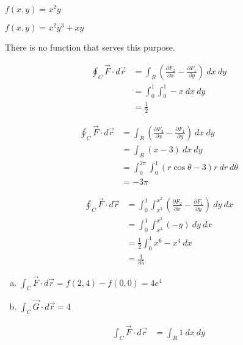 \documentclass[10pt]{extarticle}
\title{}
\author{}
\date{}
\begin{document}
  \begin{problem}{18.4}
    \begin{description}[font=\normalfont]
      \item[2:] $f(x,y) = x^2y$
      \item[6:] $f(x,y) = x^2y^3 + xy$
      \item[10:] There is no function that serves this purpose.
      \item[12:]
        \begin{align*}
          \oint_{C}\vec{F} \cdot d\vec{r} &= \int_{R} \left(\frac{\partial F_2}{\partial x} - \frac{\partial F_1}{\partial y}\right)~dx~dy\\
                                          &= \int_{0}^{1}\int_{0}^{1} -x~dx~dy\\
                                          &= \frac{1}{2}
        \end{align*}
      \item[14:]
        \begin{align*}
          \oint_{C}\vec{F} \cdot d\vec{r} &= \int_{R} \left(\frac{\partial F_2}{\partial x} - \frac{\partial F_1}{\partial y}\right)~dx~dy\\
                                          &= \int_{R} \left(x-3\right)~dx~dy\\
                                          &= \int_{0}^{2\pi}\int_{0}^{1}(r\cos\theta - 3)r~dr~d\theta\\
                                          &= -3\pi
        \end{align*}
      \item[24:]
        \begin{align*}
          \oint_{C}\vec{F} \cdot d\vec{r} &= \int_{0}^{1}\int_{x^3}^{x^2} \left(\frac{\partial F_2}{\partial x} - \frac{\partial F_1}{\partial y}\right)~dy~dx\\
                                          &= \int_{0}^{1}\int_{x^3}^{x^2}\left(-y\right)~dy~dx\\
                                          &= \frac{1}{2}\int_{0}^{1} x^6-x^4~dx\\
                                          &= \frac{1}{35}
        \end{align*}
      \item[28:]
        \begin{enumerate}[(a)]
          \item $\int_{C} \vec{F}\cdot d\vec{r} = f(2,4) - f(0,0) = 4e^{4}$
          \item $\int_{C} \vec{G}\cdot d\vec{r} = 4$
        \end{enumerate}
      \item[34:]
        \begin{align*}
          \int_{C} \vec{F} \cdot d\vec{r} &= \int_{R} 1~dx~dy
        \end{align*}
    \end{description}
  \end{problem}
\end{document}
